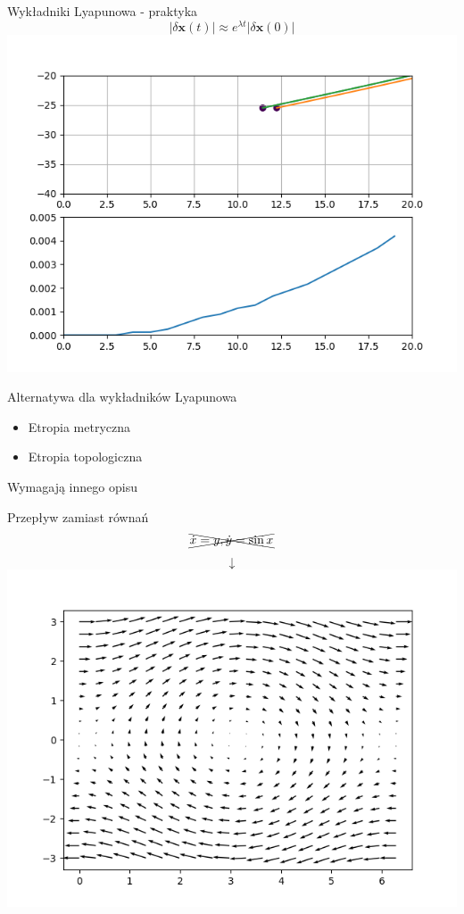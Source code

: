\documentclass{beamer}
\begin{document}
\begin{frame}[t]{Wykładniki Lyapunowa - praktyka}
\begin{equation*}
| \delta\mathbf{x}(t) | \approx e^{\lambda t} | \delta \mathbf{x}(0) |
\end{equation*}
\centering
\includegraphics[height=0.7\textheight]{lyapunov_very_short}
\end{frame}

\begin{frame}{Alternatywa dla wykładników Lyapunowa} \pause
\begin{itemize}
	\item Etropia metryczna
	\item Etropia topologiczna
\end{itemize} 
Wymagają innego opisu
\end{frame}

\begin{frame}{Przepływ zamiast równań} \pause
\centering
\begin{equation*}
\xcancel{\dot{x}=y, \dot{y}=\sin{x}}
\end{equation*}
\begin{equation*}
\downarrow
\end{equation*}
\includegraphics[height=0.7\textheight]{phase_portrait}
\end{frame}
\end{document}
